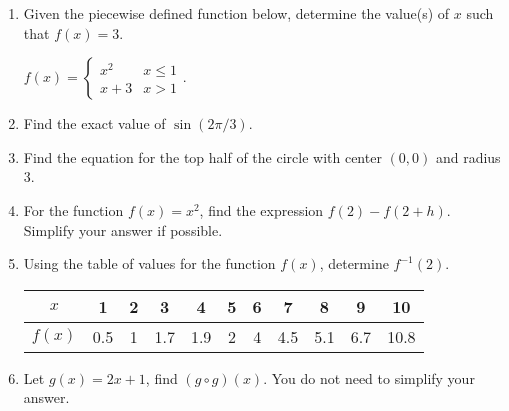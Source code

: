 \documentclass[12pt]{article}
\begin{document}
\begin{enumerate}
\item Given the piecewise defined function below, determine the value(s) of $x$ such that $f(x)=3.$

$f(x)=\begin{cases} x^2 & x \leq 1 \\ x+3 & x >1 \end{cases}.$
\quad \hfill \underline{\hspace{2in}}
\vfill

\item Find the exact value of $\sin ( 2 \pi/3).$
%

\quad \hfill \underline{\hspace{2in}}
\vfill

\item Find the equation for the top half of the circle with center $(0,0)$ and radius 3.
%

\quad \hfill \underline{\hspace{2in}}
\vfill

\vspace{1in}

\item For the function $f(x)=x^2$, find the expression $f(2)-f(2+h).$ Simplify your answer if possible.

\quad \hfill \underline{\hspace{2in}}
\vfill
\newpage
\item Using the table of values for the function $f(x)$, determine $f^{-1}(2).$\\

\begin{tabular}{| c||c|c|c|c|c|c|c|c|c|c|}
\hline
$x$ &1&2&3&4&5&6&7&8&9&10 \\
\hline
$f(x)$&0.5&1&1.7&1.9&2&4&4.5&5.1&6.7&10.8\\
\hline
\end{tabular}
%

\quad \hfill \underline{\hspace{2in}}
\vfill
\item Let $g(x)=2x+1$, find $(g \circ g)(x).$ You do not need to simplify your answer.

\quad \hfill \underline{\hspace{2in}}
\vfill


\end{enumerate}
\end{document}
